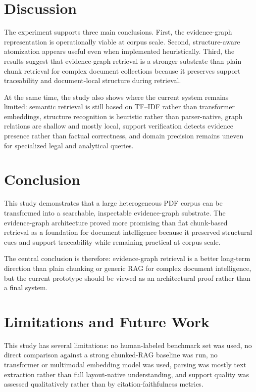 \documentclass[conference]{IEEEtran}
\begin{document}
\section{Discussion}
The experiment supports three main conclusions. First, the evidence-graph representation is operationally viable at corpus scale. Second, structure-aware atomization appears useful even when implemented heuristically. Third, the results suggest that evidence-graph retrieval is a stronger substrate than plain chunk retrieval for complex document collections because it preserves support traceability and document-local structure during retrieval.

At the same time, the study also shows where the current system remains limited: semantic retrieval is still based on TF--IDF rather than transformer embeddings, structure recognition is heuristic rather than parser-native, graph relations are shallow and mostly local, support verification detects evidence presence rather than factual correctness, and domain precision remains uneven for specialized legal and analytical queries.

\section{Conclusion}
This study demonstrates that a large heterogeneous PDF corpus can be transformed into a searchable, inspectable evidence-graph substrate. The evidence-graph architecture proved more promising than flat chunk-based retrieval as a foundation for document intelligence because it preserved structural cues and support traceability while remaining practical at corpus scale.

The central conclusion is therefore: evidence-graph retrieval is a better long-term direction than plain chunking or generic RAG for complex document intelligence, but the current prototype should be viewed as an architectural proof rather than a final system.

\section{Limitations and Future Work}
This study has several limitations: no human-labeled benchmark set was used, no direct comparison against a strong chunked-RAG baseline was run, no transformer or multimodal embedding model was used, parsing was mostly text extraction rather than full layout-native understanding, and support quality was assessed qualitatively rather than by citation-faithfulness metrics.
\end{document}
